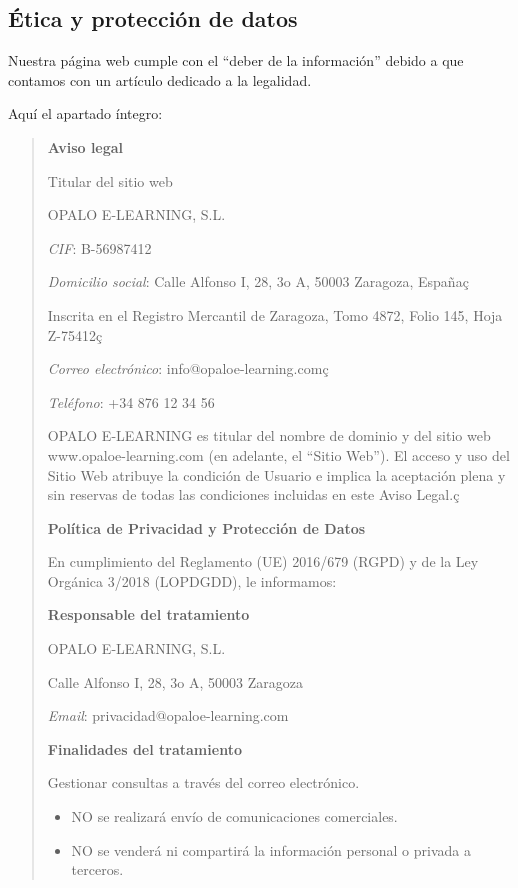 \documentclass[11.5pt]{article}
\begin{document}
	\subsection{Ética y protección de datos}
	
	Nuestra página web cumple con el “deber de la información” debido a que contamos con un artículo dedicado
	a la legalidad.
	
	Aquí el apartado íntegro:
	
	\begin{quotation}
		{\large \textbf{Aviso legal}}
		
		Titular del sitio web
		
		OPALO E-LEARNING, S.L.
		
		\textit{CIF}: B-56987412
		
		\textit{Domicilio social}: Calle Alfonso I, 28, 3o A, 50003 Zaragoza, Españaç
		
		Inscrita en el Registro Mercantil de Zaragoza, Tomo 4872, Folio 145, Hoja Z-75412ç
		
		\textit{Correo electrónico}: info@opaloe-learning.comç
		
		\textit{Teléfono}: +34 876 12 34 56
		
		OPALO E-LEARNING es titular del nombre de dominio y del sitio web www.opaloe-learning.com (en adelante, el “Sitio Web”). El acceso y uso del Sitio Web atribuye la condición de Usuario e implica la aceptación plena y sin reservas de todas las condiciones incluidas en este Aviso Legal.ç
		
		\textbf{Política de Privacidad y Protección de Datos}
		
		En cumplimiento del Reglamento (UE) 2016/679 (RGPD) y de la Ley Orgánica 3/2018 (LOPDGDD), le informamos:
		
		\textbf{Responsable del tratamiento}
		
		OPALO E-LEARNING, S.L.
		
		Calle Alfonso I, 28, 3o A, 50003 Zaragoza
		
		\textit{Email}: privacidad@opaloe-learning.com
		
		\textbf{Finalidades del tratamiento}
		
		Gestionar consultas a través del correo electrónico.
		\begin{itemize}
			\item NO se realizará envío de comunicaciones comerciales.
			\item 		NO se venderá ni compartirá la información personal o privada a terceros.
		\end{itemize}
		

\end{quotation}
\end{document}
